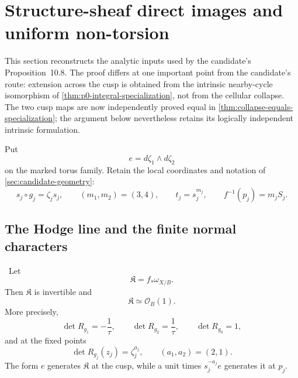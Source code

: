 \section{Structure-sheaf direct images and uniform non-torsion}
\label{sec:analytic-picard}

This section reconstructs the analytic inputs used by the candidate's
Proposition~10.8.  The proof differs at one important point from the
candidate's route: extension across the cusp is obtained from the intrinsic
nearby-cycle isomorphism of \cref{thm:p0-integral-specialization}, not from
the cellular collapse.  The two cusp maps are now independently proved equal
in \cref{thm:collapse-equals-specialization}; the argument below nevertheless
retains its logically independent intrinsic formulation.

Put
\[
 e=d\zeta _1\wedge d\zeta _2
\]
on the marked torus family.  Retain the local coordinates and notation of
\cref{sec:candidate-geometry}:
\[
s_j\circ g_j=\zeta_js_j,\qquad
(m_1,m_2)=(3,4),\qquad t_j=s_j^{m_j},\qquad
f^{-1}(p_j)=m_jS_j.
\]

\subsection{The Hodge line and the finite normal characters}

\begin{lemma}
\label{lem:hodge-line-audit}
\Verified\ Let
\[
 \mathfrak K=f_*\omega_{X/B}.
\]
Then \(\mathfrak K\) is invertible and
\[
 \mathfrak K\simeq\mathcal O_B(1).
\tag{9.1}
\]
More precisely,
\[
 \det R_{g_1}=-\frac1\tau,\qquad
 \det R_{g_2}=\frac1\tau,\qquad
 \det R_{g_0}=1,
\tag{9.2}
\]
and at the fixed points
\[
 \det R_{g_j}(z_j)=\zeta_j^{a_j},
 \qquad (a_1,a_2)=(2,1).
\tag{9.3}
\]
The form \(e\) generates \(\mathfrak K\) at the cusp, while a unit times
\(s_j^{-a_j}e\) generates it at \(p_j\).
\end{lemma}

